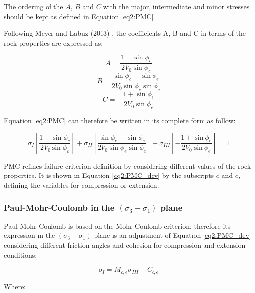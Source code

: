 The ordering of the $A$, $B$ and $C$ with the major, intermediate and minor stresses should be kept as defined in Equation \ref{eq2:PMC}. 

Following Meyer and Labuz (2013) \cite{Meyer2013}, the coefficients A, B and C in terms of the rock properties are expressed as:

\begin{equation}\label{pmc_Acoeff}
    A = \frac{1-\sin \phi_c}{2V_0\sin \phi_c}
\end{equation}
\begin{equation}\label{pmc_Bcoeff}
    B = \frac{\sin \phi_c - \sin \phi_e}{2V_0 \sin \phi_e \sin \phi_c}
\end{equation}
\begin{equation}\label{pmc_Ccoeff}
    C = -\frac{1+\sin \phi_e}{2V_0\sin \phi_e}
\end{equation}

Equation \ref{eq2:PMC} can therefore be written in its complete form as follow:

\begin{equation}\label{eq2:PMC_dev}
    \sigma_{I}\left[\frac{1-\sin \phi_{c}}{2 V_{0} \sin \phi_{c}}\right]+\sigma_{II}\left[\frac{\sin \phi_{c}-\sin \phi_{e}}{2 V_{0} \sin \phi_{e} \sin \phi_{c}}\right]+\sigma_{III}\left[-\frac{1+\sin \phi_{e}}{2 V_{0} \sin \phi_{e}}\right]=1
\end{equation}

PMC refines failure criterion definition by considering different values of the rock properties. It is shown in Equation \ref{eq2:PMC_dev} by the subscripts $c$ and $e$, defining the variables for compression or extension.

\subsubsection{Paul-Mohr-Coulomb in the \texorpdfstring{$(\sigma_3 -\sigma_1)$}{sigma 3 - sigma 1} plane}\label{ch2:PMCsig1sig3}

Paul-Mohr-Coulomb is based on the Mohr-Coulomb criterion, therefore its expression in the $(\sigma_3 -\sigma_1)$ plane is an adjustment of Equation \ref{eq2:PMC_dev} considering different friction angles and cohesion for compression and extension conditions: 

\begin{equation}\label{eq2:PMC_sig1sig3}
    \sigma_I = M_{c,e}\sigma_{III}+C_{c,e}
\end{equation}

Where:

